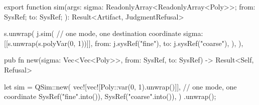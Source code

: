 \begin{tssrc}
export function sim(args: {
  sigma: ReadonlyArray<ReadonlyArray<Poly>>;
  from: SysRef;
  to: SysRef;
}): Result<Artifact, JudgmentRefusal>
\end{tssrc}
\begin{tssrc}
s.unwrap(
  j.sim({
    // one mode, one destination coordinate
    sigma: [[s.unwrap(s.polyVar(0, 1))]],
    from: j.sysRef("fine"),
    to: j.sysRef("coarse"),
  }),
),
\end{tssrc}
\begin{rustsrc}
pub fn new(sigma: Vec<Vec<Poly>>, from: SysRef, to: SysRef) -> Result<Self, Refusal>
\end{rustsrc}
\begin{rustsrc}
let sim = QSim::new(
    vec![vec![Poly::var(0, 1).unwrap()]], // one mode, one coordinate
    SysRef("fine".into()),
    SysRef("coarse".into()),
)
.unwrap();
\end{rustsrc}
